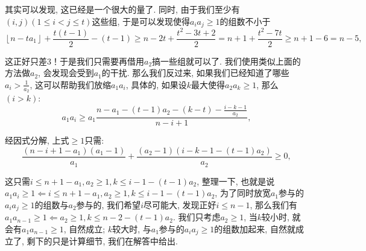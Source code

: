\documentclass[lang=cn,12pt,thmcnt=section]{elegantbook}
\newcommand{\fl}[1]{\left\lfloor #1\right\rfloor}
\begin{document}
\begin{analysis}
其实可以发现, 这已经是一个很大的量了. 同时, 由于我们至少有$(i,j)(1\le i<j\le t)$这些组, 于是可以发现使得$a_ia_j\ge 1$的组数不小于
\[
\fl{n-ta_1}+\frac{t(t-1)}{2}-(t-1)\ge n-2t+\frac{t^2-3t+2}{2}=n+1+\frac{t^2-7t}{2}\ge n+1-6=n-5,
\]

这正好只差$3$！于是我们只需要再借用$a_2$搞一些组就可以了. 我们使用类似上面的方法做$a_2$, 会发现会受到$a_1$的干扰. 那么我们反过来, 如果我们已经知道了哪些$a_i>\frac{1}{a_2}$, 这可以帮助我们放缩$a_1a_i$, 具体的, 如果设$k$最大使得$a_2a_k\ge 1$, 那么$(i>k)$: 
\[
a_1a_i\ge a_1\frac{n-a_1-(t-1)a_2-(k-t)-\frac{i-k-1}{a_2}}{n-i+1},
\]

经因式分解, 上式$\ge 1$只需: 
\[
\frac{(n-i+1-a_1)(a_1-1)}{a_1}+\frac{(a_2-1)(i-k-1-(t-1)a_2)}{a_2}\ge 0,
\]

这只需$i\le n+1-a_1, a_2\ge 1,k\le i-1-(t-1)a_2$, 整理一下, 也就是说$a_1a_i\ge 1\Leftarrow i\le n+1-a_1, a_2\ge 1,k\le i-1-(t-1)a_2$, 为了同时放宽$a_1$参与的$a_ia_j\ge 1$的组数与$a_2$参与的, 我们希望$i$尽可能大, 发现正好$i\le n-1$, 那么我们有$a_1a_{n-1}\ge 1\Leftarrow a_2\ge 1,k\le n-2-(t-1)a_2$. 我们只考虑$a_2\ge 1$, 当$k$较小时, 就会有$a_1a_{n-1}\ge 1$, 自然成立; $k$较大时, 与$a_1$参与的$a_ia_j\ge 1$的组数加起来, 自然就成立了, 剩下的只是计算细节, 我们在解答中给出.
\end{analysis}
\end{document}
